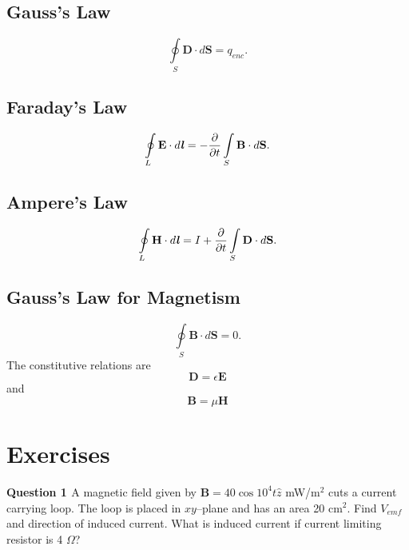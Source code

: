 \documentclass[12pt,a4paper]{article}
\begin{document}
\subsection{Gauss's Law}
\begin{equation}
\oint\limits_{S} \textbf{D}\cdot d\textbf{S}=q_{enc}.
\end{equation}
\subsection{Faraday's Law}
\begin{equation}
\oint\limits_{L} \textbf{E}\cdot d\textbf{\textit{l}}=-\dfrac{\partial}{\partial t}\int\limits_{S}\textbf{B}\cdot d\textbf{S}.
\end{equation}
\subsection{Ampere's Law}
\begin{equation}
\oint\limits_{L} \textbf{H}\cdot d\textbf{\textit{l}}=I+\dfrac{\partial}{\partial t}\int\limits_{S}\textbf{D}\cdot d\textbf{S}.
\end{equation}
\subsection{Gauss's Law for Magnetism}
\begin{equation}
\oint\limits_{S} \textbf{B}\cdot d\textbf{S}=0.
\end{equation}
The constitutive relations are
\begin{equation}
\textbf{D}=\epsilon\textbf{E}
\end{equation}
and
\begin{equation}
\textbf{B}=\mu\textbf{H}
\end{equation}
\section{Exercises}
\noindent\textbf{Question 1 \cite[Problem 9.4, page 404]{Sadiku}} A magnetic field given by $\textbf{B}=40\cos 10^4 t\hat z$ mW/m$^2$ cuts a current carrying loop. The loop is placed in $xy$--plane and has an area 20 cm$^2$. Find $V_{emf}$ and direction of induced current. What is induced current if current limiting resistor is 4 $\Omega$?


\end{document}

